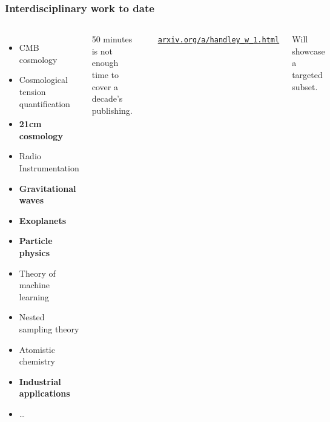 \documentclass[aspectratio=169, handout]{beamer}
\begin{document}
\begin{frame}
    \frametitle{Interdisciplinary work to date}
    \begin{columns}
        \begin{itemize}
            \item CMB cosmology
            \item Cosmological tension quantification
            \item \textbf{21cm cosmology}
            \item Radio Instrumentation
            \item \textbf{Gravitational waves}
            \item \textbf{Exoplanets}
            \item \textbf{Particle physics}
            \item Theory of machine learning
            \item Nested sampling theory
            \item Atomistic chemistry
            \item \textbf{Industrial applications}
            \item \ldots
        \end{itemize}
        50 minutes is not enough time to cover a decade's publishing.

        \vspace{10pt}

        \includegraphics[width=\textwidth]{figures/publishing.png}

        \hfill\textcolor{C0}{\texttt{\href{https://arxiv.org/a/handley_w_1.html}{arxiv.org/a/handley\_w\_1.html}}} 

        Will showcase a targeted subset.
    \end{columns}
\end{frame}
\end{document}
